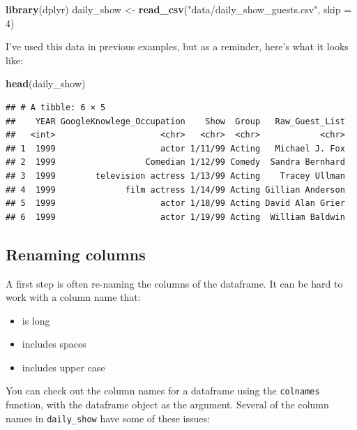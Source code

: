 \documentclass[]{book}
\makeatletter
\newenvironment{Shaded}{\begin{snugshade}}{\end{snugshade}}
\newcommand{\KeywordTok}[1]{\textcolor[rgb]{0.13,0.29,0.53}{\textbf{{#1}}}}
\newcommand{\DataTypeTok}[1]{\textcolor[rgb]{0.13,0.29,0.53}{{#1}}}
\newcommand{\DecValTok}[1]{\textcolor[rgb]{0.00,0.00,0.81}{{#1}}}
\newcommand{\StringTok}[1]{\textcolor[rgb]{0.31,0.60,0.02}{{#1}}}
\newcommand{\NormalTok}[1]{{#1}}
\providecommand{\tightlist}{%
  \setlength{\itemsep}{0pt}\setlength{\parskip}{0pt}}
\newenvironment{kframe}{%
\medskip{}
\setlength{\fboxsep}{.8em}
 \def\at@end@of@kframe{}%
 \ifinner\ifhmode%
  \def\at@end@of@kframe{\end{minipage}}%
  \begin{minipage}{\columnwidth}%
 \fi\fi%
 \def\FrameCommand##1{\hskip\@totalleftmargin \hskip-\fboxsep
 \colorbox{shadecolor}{##1}\hskip-\fboxsep
     \hskip-\linewidth \hskip-\@totalleftmargin \hskip\columnwidth}%
 \MakeFramed {\advance\hsize-\width
   \@totalleftmargin\z@ \linewidth\hsize
   \@setminipage}}%
 {\par\unskip\endMakeFramed%
 \at@end@of@kframe}
\renewenvironment{Shaded}{\begin{kframe}}{\end{kframe}}
\makeatother
\begin{document}
\begin{Shaded}
\begin{Highlighting}[]
\KeywordTok{library}\NormalTok{(dplyr)}
\NormalTok{daily_show <-}\StringTok{ }\KeywordTok{read_csv}\NormalTok{(}\StringTok{"data/daily_show_guests.csv"}\NormalTok{, }\DataTypeTok{skip =} \DecValTok{4}\NormalTok{)}
\end{Highlighting}
\end{Shaded}

I've used this data in previous examples, but as a reminder, here's what
it looks like:

\begin{Shaded}
\begin{Highlighting}[]
\KeywordTok{head}\NormalTok{(daily_show)}
\end{Highlighting}
\end{Shaded}

\begin{verbatim}
## # A tibble: 6 × 5
##    YEAR GoogleKnowlege_Occupation    Show  Group   Raw_Guest_List
##   <int>                     <chr>   <chr>  <chr>            <chr>
## 1  1999                     actor 1/11/99 Acting   Michael J. Fox
## 2  1999                  Comedian 1/12/99 Comedy  Sandra Bernhard
## 3  1999        television actress 1/13/99 Acting    Tracey Ullman
## 4  1999              film actress 1/14/99 Acting Gillian Anderson
## 5  1999                     actor 1/18/99 Acting David Alan Grier
## 6  1999                     actor 1/19/99 Acting  William Baldwin
\end{verbatim}

\subsection{Renaming columns}\label{renaming-columns}

A first step is often re-naming the columns of the dataframe. It can be
hard to work with a column name that:

\begin{itemize}
\tightlist
\item
  is long
\item
  includes spaces
\item
  includes upper case
\end{itemize}

You can check out the column names for a dataframe using the
\texttt{colnames} function, with the dataframe object as the argument.
Several of the column names in \texttt{daily\_show} have some of these
issues:
\end{document}
